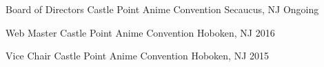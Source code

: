 

\begin{cvhonors}

  \cvhonor
    {Board of Directors} %
    {Castle Point Anime Convention} %
    {Secaucus, NJ} %
    {Ongoing} %

  \cvhonor
    {Web Master} %
    {Castle Point Anime Convention} %
    {Hoboken, NJ} %
    {2016} %

  \cvhonor
    {Vice Chair} %
    {Castle Point Anime Convention} %
    {Hoboken, NJ} %
    {2015} %

\end{cvhonors}
